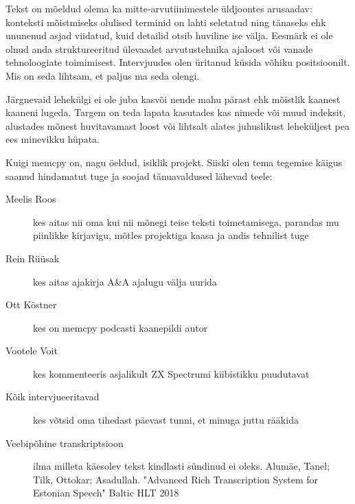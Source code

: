 Tekst on mõeldud olema ka mitte-arvutiinimestele üldjoontes arusaadav: 
konteksti mõistmiseks olulised terminid on lahti seletatud ning tänaseks ehk 
ununenud asjad viidatud, kuid detailid otsib huviline ise välja. Eesmärk ei ole 
olnud anda struktureeritud ülevaadet arvutustehnika ajaloost või vanade 
tehnoloogiate toimimisest. Intervjuudes olen üritanud küsida võhiku 
positsioonilt. Mis on seda lihtsam, et paljus ma seda olengi.

Järgnevaid lehekülgi ei ole juba kasvõi nende mahu pärast ehk mõistlik kaanest 
kaaneni lugeda. Targem on teda lapata kasutades kas nimede või muud indeksit, 
alustades mõnest huvitavamast loost või lihtsalt alates juhuslikust leheküljest 
pea ees minevikku hüpata.

Kuigi memcpy on, nagu öeldud, isiklik projekt. Siiski olen tema tegemise käigus 
saanud hindamatut tuge ja soojad tänuavaldused lähevad teele:

\begin{description}
	\item[Meelis Roos] kes aitas nii oma kui nii 
mõnegi teise teksti toimetamisega, parandas mu piinlikke kirjavigu, mõtles 
projektiga kaasa ja andis tehnilist tuge
	\item[Rein Rüüsak] kes aitas ajakirja A\&A 
ajalugu välja uurida
	\item[Ott Köstner] kes on memcpy podcasti 
kaanepildi autor
	\item[Vootele Voit] kes kommenteeris 
asjalikult ZX Spectrumi kiibistikku puudutavat
	\item[Kõik intervjueeritavad] kes võtsid oma tihedast päevast tunni, et 
minuga juttu rääkida
	\item[Veebipõhine transkriptsioon] ilma milleta käesolev tekst 
kindlasti sündinud ei oleks. Alumäe, Tanel; Tilk, Ottokar; Asadullah. "Advanced 
Rich Transcription System for Estonian Speech" Baltic HLT 2018
\end{description}
